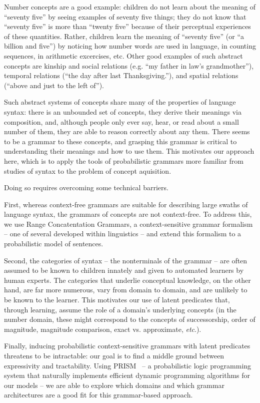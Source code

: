 \documentclass[10pt, twocolumn]{article}
\begin{document}
Number concepts are a good example: children do not learn about the
meaning of ``seventy five'' by seeing examples of seventy five things;
they do not know that ``seventy five'' is more than ``twenty five''
because of their perceptual experiences of these quantities. Rather,
children learn the meaning of ``seventy five'' (or ``a billion and
five'') by noticing how number words are used in language, in counting
sequences, in arithmetic excercises, etc. Other good examples of such
abstract concepts are kinship and social relations (e.g. ``my father
in law's grandmother''), temporal relations (``the day after last
Thanksgiving.''), and spatial relations (``above and just to the left
of'').

Such abstract systems of concepts share many of the properties of
language syntax: there is an unbounded set of concepts, they derive
their meanings via composition, and, although people only ever say,
hear, or read about a small number of them, they are able to reason
correctly about any them. There seems to be a grammar to these
concepts, and grasping this grammar is critical to understanding their
meanings and how to use them. This motivates our approach here, which
is to apply the tools of probabilistic grammars more familiar from
studies of syntax to the problem of concept aquisition.

Doing so requires overcoming some technical barriers.

First, whereas context-free grammars are suitable for describing large
swaths of language syntax, the grammars of concepts are not
context-free. To address this, we use Range Concatentation Grammars, a
context-sensitive grammar formalism -- one of several developed within
linguistics -- and extend this formalism to a probabilistic model of
sentences. 

Second, the categories of syntax -- the nonterminals of the grammar --
are often assumed to be known to children innately and given to
automated learners by human experts. The categories that underlie
conceptual knowledge, on the other hand, are far more numerous, vary
from domain to domain, and are unlikely to be known to the
learner. This motivates our use of latent predicates that, through
learning, assume the role of a domain's underlying concepts (in the
number domain, these might correspond to the concepts of
successorship, order of magnitude, magnitude comparison, exact
vs. approximate, {\it etc}.).

Finally, inducing probabilistic context-sensitive grammars with latent
predicates threatens to be intractable: our goal is to find a
middle ground between expressivity and tractability. Using
PRISM~\cite{DBLP:journals/jair/SatoK01} -- a probabilistic logic programming system that naturally
implements efficient dynamic programming algorithms for our models --
we are able to explore which domains and which grammar architectures
are a good fit for this grammar-based approach.
\end{document}
